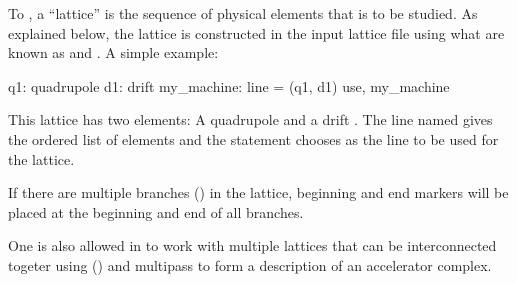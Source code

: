 To \bmad, a ``lattice'' is the sequence of physical elements that is
to be studied. As explained below, the lattice is constructed in the
input lattice file using what are known as  and
. A simple example:
\begin{example}
  q1: quadrupole
  d1: drift
  my_machine: line = (q1, d1)
  use, my_machine
\end{example}
This lattice has two elements: A quadrupole  and a drift
.  The line named  gives the ordered list of
elements and the  statement chooses  as the
line to be used for the lattice.


If there are multiple branches () in the lattice,
beginning and end markers will be placed at the beginning and end of
all branches.

One is also allowed in \bmad to work with multiple lattices that can
be interconnected togeter using  ()
and multipass  to form a description of an accelerator
complex.


